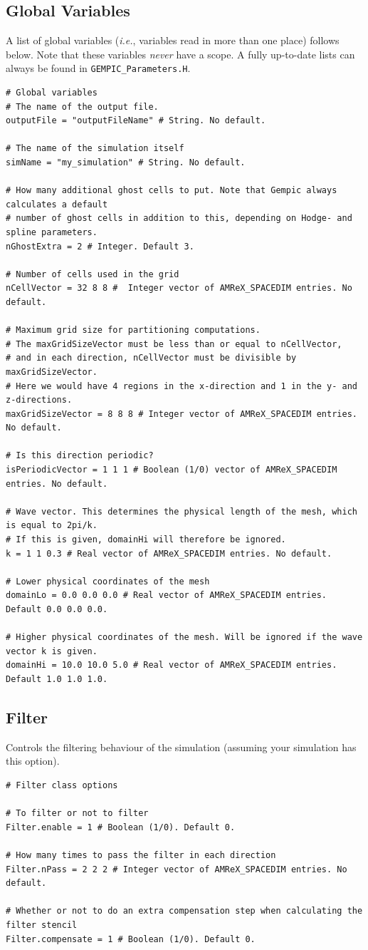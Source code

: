 \documentclass[11pt]{article}
\begin{document}
\subsection{Global Variables}
A list of global variables (\emph{i.e.}, variables read in more than one place) follows below. Note that these variables \emph{never} have a scope. A fully up-to-date lists can always be found in \verb|GEMPIC_Parameters.H|.
\begin{lstlisting}[language=pkgconfig]
# Global variables
# The name of the output file.
outputFile = "outputFileName" # String. No default.

# The name of the simulation itself
simName = "my_simulation" # String. No default.

# How many additional ghost cells to put. Note that Gempic always calculates a default
# number of ghost cells in addition to this, depending on Hodge- and spline parameters.
nGhostExtra = 2 # Integer. Default 3.

# Number of cells used in the grid
nCellVector = 32 8 8 #  Integer vector of AMReX_SPACEDIM entries. No default.

# Maximum grid size for partitioning computations. 
# The maxGridSizeVector must be less than or equal to nCellVector,
# and in each direction, nCellVector must be divisible by maxGridSizeVector.
# Here we would have 4 regions in the x-direction and 1 in the y- and z-directions.
maxGridSizeVector = 8 8 8 # Integer vector of AMReX_SPACEDIM entries. No default.

# Is this direction periodic?
isPeriodicVector = 1 1 1 # Boolean (1/0) vector of AMReX_SPACEDIM entries. No default.

# Wave vector. This determines the physical length of the mesh, which is equal to 2pi/k.
# If this is given, domainHi will therefore be ignored.
k = 1 1 0.3 # Real vector of AMReX_SPACEDIM entries. No default.

# Lower physical coordinates of the mesh
domainLo = 0.0 0.0 0.0 # Real vector of AMReX_SPACEDIM entries. Default 0.0 0.0 0.0.

# Higher physical coordinates of the mesh. Will be ignored if the wave vector k is given.
domainHi = 10.0 10.0 5.0 # Real vector of AMReX_SPACEDIM entries. Default 1.0 1.0 1.0.
\end{lstlisting}

\subsection{Filter}
Controls the filtering behaviour of the simulation (assuming your simulation has this option).
\begin{lstlisting}[language=pkgconfig]
# Filter class options

# To filter or not to filter 
Filter.enable = 1 # Boolean (1/0). Default 0.

# How many times to pass the filter in each direction
Filter.nPass = 2 2 2 # Integer vector of AMReX_SPACEDIM entries. No default.

# Whether or not to do an extra compensation step when calculating the filter stencil
Filter.compensate = 1 # Boolean (1/0). Default 0.
\end{lstlisting}
\end{document}
